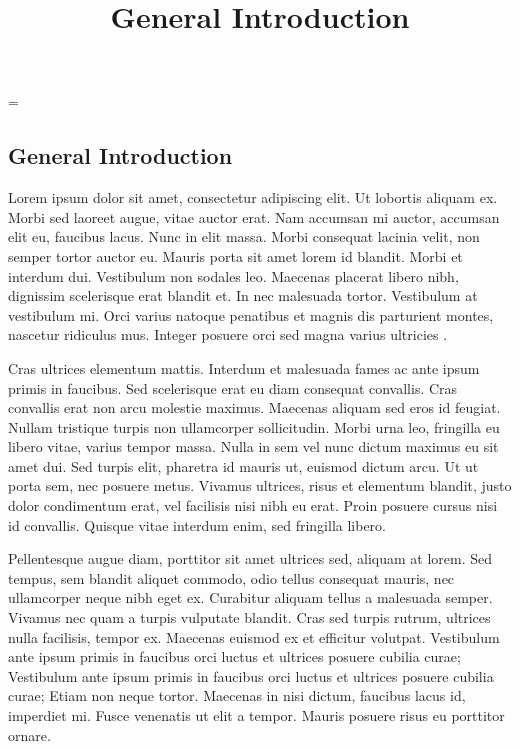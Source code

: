 \emergencystretch=\maxdimen
{}

\begin{refsection}

\title{General Introduction}

\chapter{General Introduction}
\AddLabels

\vspace{-1cm}

Lorem ipsum dolor sit amet, consectetur adipiscing elit. Ut lobortis aliquam ex. Morbi sed laoreet augue, vitae auctor erat. Nam accumsan mi auctor, accumsan elit eu, faucibus lacus. Nunc in elit massa. Morbi consequat lacinia velit, non semper tortor auctor eu. Mauris porta sit amet lorem id blandit. Morbi et interdum dui. Vestibulum non sodales leo. Maecenas placerat libero nibh, dignissim scelerisque erat blandit et. In nec malesuada tortor. Vestibulum at vestibulum mi. Orci varius natoque penatibus et magnis dis parturient montes, nascetur ridiculus mus. Integer posuere orci sed magna varius ultricies \cite{example1}.

Cras ultrices elementum mattis. Interdum et malesuada fames ac ante ipsum primis in faucibus. Sed scelerisque erat eu diam consequat convallis. Cras convallis erat non arcu molestie maximus. Maecenas aliquam sed eros id feugiat. Nullam tristique turpis non ullamcorper sollicitudin. Morbi urna leo, fringilla eu libero vitae, varius tempor massa. Nulla in sem vel nunc dictum maximus eu sit amet dui. Sed turpis elit, pharetra id mauris ut, euismod dictum arcu. Ut ut porta sem, nec posuere metus. Vivamus ultrices, risus et elementum blandit, justo dolor condimentum erat, vel facilisis nisi nibh eu erat. Proin posuere cursus nisi id convallis. Quisque vitae interdum enim, sed fringilla libero.

Pellentesque augue diam, porttitor sit amet ultrices sed, aliquam at lorem. Sed tempus, sem blandit aliquet commodo, odio tellus consequat mauris, nec ullamcorper neque nibh eget ex. Curabitur aliquam tellus a malesuada semper. Vivamus nec quam a turpis vulputate blandit. Cras sed turpis rutrum, ultrices nulla facilisis, tempor ex. Maecenas euismod ex et efficitur volutpat. Vestibulum ante ipsum primis in faucibus orci luctus et ultrices posuere cubilia curae; Vestibulum ante ipsum primis in faucibus orci luctus et ultrices posuere cubilia curae; Etiam non neque tortor. Maecenas in nisi dictum, faucibus lacus id, imperdiet mi. Fusce venenatis ut elit a tempor. Mauris posuere risus eu porttitor ornare.


\end{refsection}
